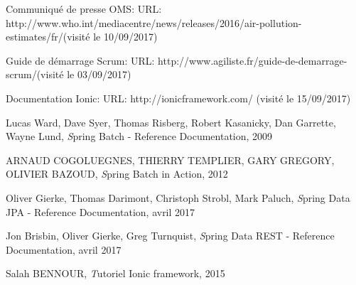 
\begin{thebibliography}{9}
	Communiqué de presse OMS: URL: http://www.who.int/mediacentre/news/releases/2016/air-pollution-estimates/fr/(visité le 10/09/2017)
	
	Guide de démarrage Scrum: URL: http://www.agiliste.fr/guide-de-demarrage-scrum/(visité le 03/09/2017)
	
	Documentation Ionic: URL: http://ionicframework.com/ (visité le 15/09/2017)
	
	Lucas Ward, Dave Syer, Thomas
	Risberg, Robert Kasanicky, Dan Garrette, Wayne Lund,
	\emph Spring Batch - Reference Documentation, 2009
	
 	ARNAUD COGOLUEGNES, THIERRY TEMPLIER, GARY GREGORY,	OLIVIER BAZOUD,
	\emph Spring Batch in Action, 2012
	
	Oliver Gierke, Thomas Darimont, Christoph Strobl, Mark Paluch,
	\emph Spring Data JPA - Reference Documentation, avril 2017
		
	Jon Brisbin, Oliver Gierke, Greg Turnquist,
	\emph Spring Data REST - Reference Documentation, avril 2017
	
	Salah BENNOUR,
	\emph Tutoriel Ionic framework, 2015
	
	
	
\end{thebibliography}